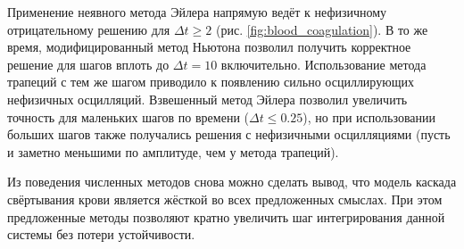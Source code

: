 Применение неявного метода Эйлера напрямую ведёт к нефизичному отрицательному решению для $ \Delta t \geqslant 2 $ (рис. \ref{fig:blood_coagulation}).
В то же время, модифицированный метод Ньютона позволил получить корректное решение для шагов вплоть до $ \Delta t = 10 $ включительно.
Использование метода трапеций с тем же шагом приводило к появлению сильно осциллирующих нефизичных осцилляций.
Взвешенный метод Эйлера позволил увеличить точность для маленьких шагов по времени ($ \Delta t \leqslant 0.25 $),
но при использовании больших шагов также получались решения с нефизичными осцилляциями
(пусть и заметно меньшими по амплитуде, чем у метода трапеций).

Из поведения численных методов снова можно сделать вывод,
что модель каскада свёртывания крови является жёсткой во всех предложенных смыслах.
При этом предложенные методы позволяют кратно увеличить шаг интегрирования данной системы без потери устойчивости.

